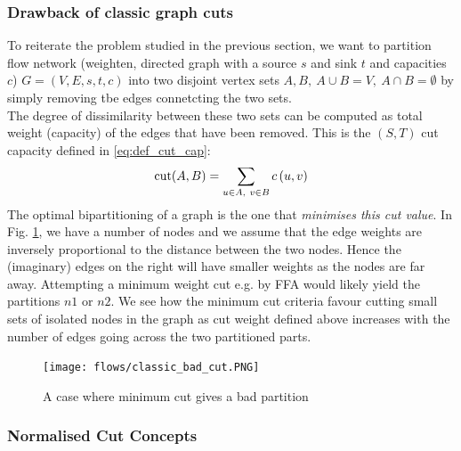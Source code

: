 \documentclass[a4paper]{article}
\begin{document}
\subsubsection{Drawback of classic graph cuts}
To reiterate the problem studied in the previous section, we want to partition flow network (weighten, directed graph with a source $s$ and sink $t$ and capacities $c$) $G=(V,E,s,t,c)$ into two disjoint vertex sets $A, B, \ A\cup B = V, \ A\cap B = \emptyset$ by simply removing tbe edges connetcting the two sets.\\
The degree of dissimilarity between these two sets can be computed as total weight (capacity)
of the edges that have been removed. This is the $(S,T)$ cut capacity defined in \eqref{eq:def_cut_cap}:
\[
\textup{cut}(A,B)=\sum\limits_{u\in A,\ v\in B}{c\left( u,v \right)}
\]
The optimal bipartitioning of a graph is the one that \textit{minimises this cut value}. In Fig. \ref{fig:classic_bad_cut}, we have a number of nodes and we assume that the edge weights are inversely proportional to the distance between the two nodes. Hence the (imaginary) edges on the right will have smaller weights as the nodes are far away. Attempting a minimum weight cut e.g. by FFA would likely yield the partitions $n1$ or $n2$. We see how the minimum cut criteria favour cutting small sets of isolated nodes in the graph as cut weight defined above increases with the number of edges going across the two partitioned parts.
\begin{figure}[H]
	\centering %
	\texttt{[image: flows/classic\_bad\_cut.PNG]}
    \caption{A case where minimum cut gives a bad partition}
    \label{fig:classic_bad_cut} %
\end{figure}





\subsubsection{Normalised Cut Concepts}
\end{document}
